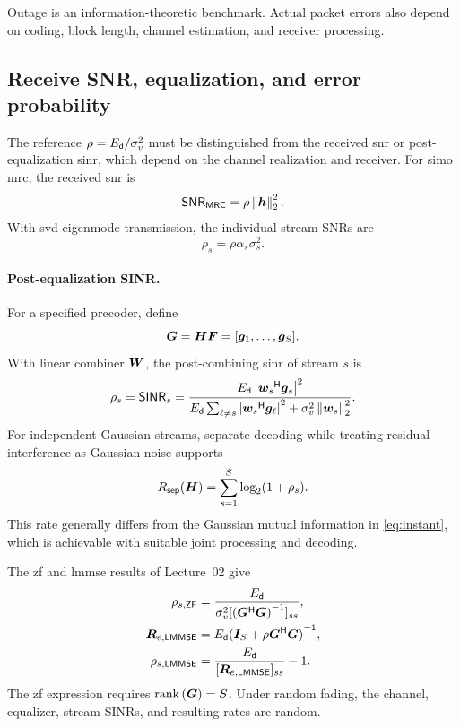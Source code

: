 Outage is an information-theoretic benchmark.
Actual packet errors also depend on coding,
block length, channel estimation, and receiver
processing.


\subsection{Receive SNR, equalization, and error probability}

The reference $\rho=E_{\mathsf{d}}/\sigma_v^2$ must be distinguished from the received \ac{snr} or post-equalization \ac{sinr}, which depend on the channel realization and receiver.
%
For \ac{simo} \ac{mrc}, the received \ac{snr} is
\begin{equation*}
	\mathsf{SNR}_{\mathsf{MRC}}=\rho\left\|\bm{h}\right\|_2^2.
\end{equation*}
With \ac{svd} eigenmode transmission, the
individual stream SNRs are
\begin{equation*}
	\rho_s=\rho\alpha_s\sigma_s^2.
\end{equation*}

\paragraph{Post-equalization SINR.}
For a specified precoder, define
\begin{equation*}
	\bm{G}=\bm{H}\bm{F}
	=[\bm{g}_1,\ldots,\bm{g}_{S}].
\end{equation*}
With linear combiner $\bm{W}$, the post-combining \ac{sinr} of stream $s$ is
\begin{equation}\label{eq:sinr}
	\rho_s=\mathsf{SINR}_s
	=\frac{
		E_{\mathsf{d}}\left|{\bm{w}_s}^{\mathsf{H}}\bm{g}_s\right|^2
	}{
		E_{\mathsf{d}}\sum_{\ell\ne s}
		\left|{\bm{w}_s}^{\mathsf{H}}\bm{g}_\ell\right|^2
		+\sigma_v^2\left\|\bm{w}_s\right\|_2^2
	}.
\end{equation}
%
For independent Gaussian streams, separate decoding while treating residual interference as Gaussian noise supports
\begin{equation}\label{eq:seprate}
	R_{\mathsf{sep}}(\bm{H})
	=\sum_{s=1}^{S}\log_2(1+\rho_s).
\end{equation}
This rate generally differs from the Gaussian mutual information in \eqref{eq:instant}, which is achievable with suitable joint processing and decoding.

The \ac{zf} and \ac{lmmse} results of Lecture~02 give
\begin{align}
	\rho_{s,\mathsf{ZF}}
	&=\frac{E_{\mathsf{d}}}{
		\sigma_v^2
		[{({\bm{G}}^{\mathsf{H}}\bm{G})}^{-1}]_{ss}
	},
	\label{eq:zf-sinr}\\
	\bm{R}_{e,\mathsf{LMMSE}}
	&=E_{\mathsf{d}}{(
		\bm{I}_{S}+\rho{\bm{G}}^{\mathsf{H}}\bm{G}
		)}^{-1},
	\nonumber\\
	\rho_{s,\mathsf{LMMSE}}
	&=\frac{E_{\mathsf{d}}}{
		[\bm{R}_{e,\mathsf{LMMSE}}]_{ss}
	}-1.
	\label{eq:lmmse-sinr}
\end{align}
The \ac{zf} expression requires
$\operatorname{rank}\left(\bm{G}\right)=S$.
Under random fading, the channel, equalizer,
stream SINRs, and resulting rates are random.

